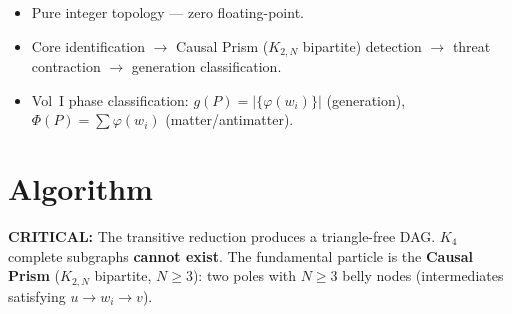 \documentclass[11pt, a4paper, openany]{book}
\newcounter{thm}[chapter]
\newenvironment{introduction}[1][Chapter Overview]{%
  \begin{tcolorbox}[
    enhanced,colback=structure!5,colframe=structure,
    colbacktitle=structure,coltitle=white,
    fonttitle=\small\bfseries,title={#1},
    arc=2pt,boxrule=0.7pt,
    left=8pt,right=8pt,top=6pt,bottom=6pt,
    before skip=12pt,after skip=12pt
  ]\itshape\begin{itemize}[leftmargin=*,itemsep=2pt,parsep=0pt]
}{%
  \end{itemize}\end{tcolorbox}
}
\begin{document}
\begin{introduction}[Kuratowski Contraction]
  \item Pure integer topology --- zero floating-point.
  \item Core identification $\to$ Causal Prism ($K_{2,N}$ bipartite) detection $\to$ threat contraction $\to$ generation classification.
  \item Vol~I phase classification: $g(P) = |\{\varphi(w_i)\}|$ (generation), $\Phi(P) = \sum \varphi(w_i)$ (matter/antimatter).
\end{introduction}

\section{Algorithm}

\textbf{CRITICAL:} The transitive reduction produces a triangle-free DAG.
$K_4$ complete subgraphs \textbf{cannot exist}.  The fundamental particle is
the \textbf{Causal Prism} ($K_{2,N}$ bipartite, $N \ge 3$): two poles with
$N \ge 3$ belly nodes (intermediates satisfying $u \to w_i \to v$).
\end{document}

